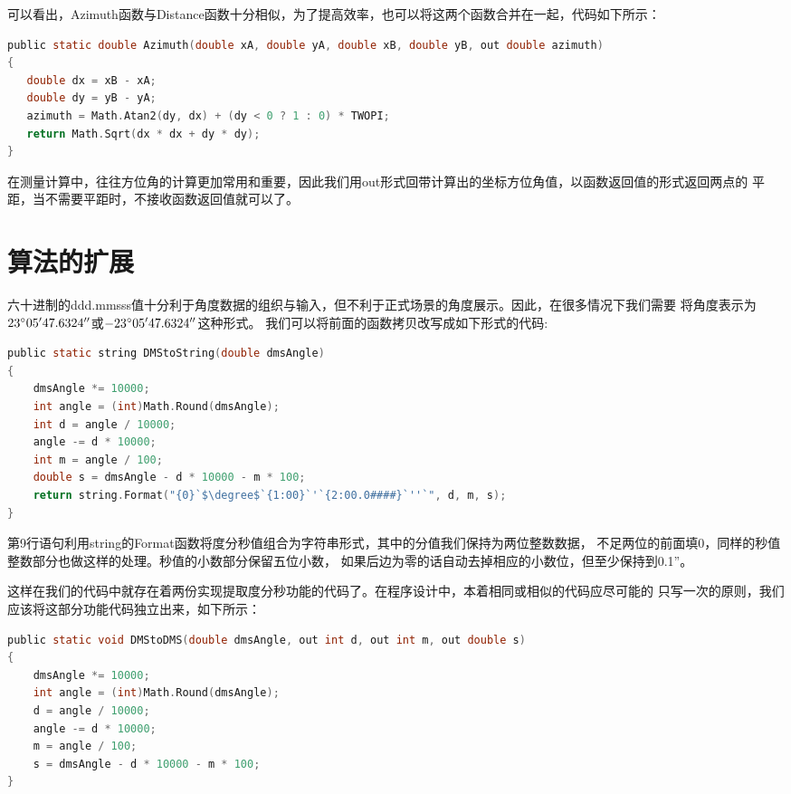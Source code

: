 可以看出，Azimuth函数与Distance函数十分相似，为了提高效率，也可以将这两个函数合并在一起，代码如下所示：

\begin{lstlisting}[language=C]
public static double Azimuth(double xA, double yA, double xB, double yB, out double azimuth)
{
   double dx = xB - xA;
   double dy = yB - yA;
   azimuth = Math.Atan2(dy, dx) + (dy < 0 ? 1 : 0) * TWOPI;
   return Math.Sqrt(dx * dx + dy * dy);
}
\end{lstlisting}

在测量计算中，往往方位角的计算更加常用和重要，因此我们用out形式回带计算出的坐标方位角值，以函数返回值的形式返回两点的
平距，当不需要平距时，不接收函数返回值就可以了。


\section{算法的扩展}

六十进制的ddd.mmsss值十分利于角度数据的组织与输入，但不利于正式场景的角度展示。因此，在很多情况下我们需要
将角度表示为$23^\circ 05'47.6324''$或$-23^\circ 05'47.6324''$这种形式。
我们可以将前面的函数拷贝改写成如下形式的代码:

\begin{lstlisting}[language=C]
public static string DMStoString(double dmsAngle)
{
    dmsAngle *= 10000; 
    int angle = (int)Math.Round(dmsAngle);
    int d = angle / 10000;
    angle -= d * 10000;
    int m = angle / 100;
    double s = dmsAngle - d * 10000 - m * 100;
    return string.Format("{0}`$\degree$`{1:00}`'`{2:00.0####}`''`", d, m, s);
}
\end{lstlisting}

第9行语句利用string的Format函数将度分秒值组合为字符串形式，其中的分值我们保持为两位整数数据，
不足两位的前面填0，同样的秒值整数部分也做这样的处理。秒值的小数部分保留五位小数，
如果后边为零的话自动去掉相应的小数位，但至少保持到0.1''。

这样在我们的代码中就存在着两份实现提取度分秒功能的代码了。在程序设计中，本着相同或相似的代码应尽可能的
只写一次的原则，我们应该将这部分功能代码独立出来，如下所示：

\begin{lstlisting}[language=C]
public static void DMStoDMS(double dmsAngle, out int d, out int m, out double s)
{
    dmsAngle *= 10000; 
    int angle = (int)Math.Round(dmsAngle);
    d = angle / 10000;
    angle -= d * 10000;
    m = angle / 100;
    s = dmsAngle - d * 10000 - m * 100;
}
\end{lstlisting}

